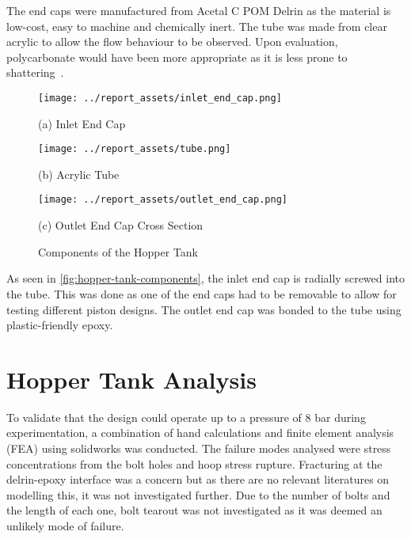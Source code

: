 The end caps were manufactured from Acetal C POM Delrin as the material is low-cost, easy to machine and chemically inert. The tube was made from clear acrylic to allow the flow behaviour to be observed. Upon evaluation, polycarbonate would have been more appropriate as it is less prone to shattering~\cite{SADEGHIESFAHLANI2021e06856}.
\begin{figure}[htbp]
    \centering

    \begin{minipage}{0.3\textwidth}
        \centering
        \texttt{[image: ../report\_assets/inlet\_end\_cap.png]}
        \caption*{(a) Inlet End Cap}
    \end{minipage}
    \hfill
    \begin{minipage}{0.3\textwidth}
        \centering
        \texttt{[image: ../report\_assets/tube.png]}
        \caption*{(b) Acrylic Tube}
    \end{minipage}
    \hfill
    \begin{minipage}{0.3\textwidth}
        \centering
        \texttt{[image: ../report\_assets/outlet\_end\_cap.png]}
        \caption*{(c) Outlet End Cap Cross Section}
    \end{minipage}
    \caption{Components of the Hopper Tank}\label{fig:hopper-tank-components}
\end{figure}
As seen in \autoref{fig:hopper-tank-components}, the inlet end cap is radially screwed into the tube. This was done as one of the end caps had to be removable to allow for testing different piston designs. The outlet end cap was bonded to the tube using plastic-friendly epoxy.
\section{Hopper Tank Analysis}\label{sec:tank-fea-setup}
To validate that the design could operate up to a pressure of 8 bar during experimentation, a combination of hand calculations and finite element analysis (FEA) using solidworks was conducted. The failure modes analysed were stress concentrations from the bolt holes and hoop stress rupture. Fracturing at the delrin-epoxy interface was a concern but as there are no relevant literatures on modelling this, it was not investigated further. Due to the number of bolts and the length of each one, bolt tearout was not investigated as it was deemed an unlikely mode of failure.


